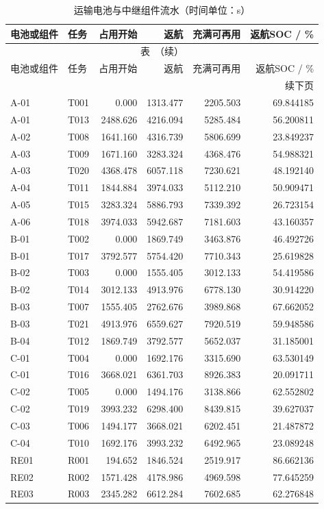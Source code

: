 \begingroup
\small
\setlength{\tabcolsep}{3pt}
\renewcommand{\arraystretch}{1.10}
\begin{longtable}{@{}llrrrr@{}}
\caption{运输电池与中继组件流水（时间单位：s）}\label{tab:q3-batteries}\\
\toprule
电池或组件 & 任务 & 占用开始 & 返航 & 充满可再用 & 返航SOC / \% \\
\midrule
\endfirsthead
\multicolumn{6}{c}{\small 表~\thetable{}（续）}\\
\toprule
电池或组件 & 任务 & 占用开始 & 返航 & 充满可再用 & 返航SOC / \% \\
\midrule
\endhead
\midrule
\multicolumn{6}{r}{\small 续下页}\\
\endfoot
\bottomrule
\endlastfoot
A-01 & T001 & 0.000 & 1313.477 & 2205.503 & 69.844185 \\
A-01 & T013 & 2488.626 & 4216.094 & 5285.484 & 56.200811 \\
A-02 & T008 & 1641.160 & 4316.739 & 5806.699 & 23.849237 \\
A-03 & T009 & 1671.160 & 3283.324 & 4368.476 & 54.988321 \\
A-03 & T020 & 4368.478 & 6057.118 & 7230.621 & 48.192140 \\
A-04 & T011 & 1844.884 & 3974.033 & 5112.210 & 50.909471 \\
A-05 & T015 & 3283.324 & 5886.793 & 7339.392 & 26.723154 \\
A-06 & T018 & 3974.033 & 5942.687 & 7181.603 & 43.160357 \\
B-01 & T002 & 0.000 & 1869.749 & 3463.876 & 46.492726 \\
B-01 & T017 & 3792.577 & 5754.420 & 7710.343 & 25.619828 \\
B-02 & T003 & 0.000 & 1555.405 & 3012.133 & 54.419586 \\
B-02 & T014 & 3012.133 & 4913.976 & 6778.130 & 30.914220 \\
B-03 & T007 & 1555.405 & 2762.676 & 3989.868 & 67.662052 \\
B-03 & T021 & 4913.976 & 6559.627 & 7920.519 & 59.948586 \\
B-04 & T012 & 1869.749 & 3792.577 & 5652.037 & 31.185001 \\
C-01 & T004 & 0.000 & 1692.176 & 3315.690 & 63.530149 \\
C-01 & T016 & 3668.021 & 6361.703 & 8926.383 & 20.091711 \\
C-02 & T005 & 0.000 & 1494.176 & 3138.866 & 62.552802 \\
C-02 & T019 & 3993.232 & 6298.400 & 8439.815 & 39.627037 \\
C-03 & T006 & 1494.177 & 3668.021 & 6202.451 & 21.487872 \\
C-04 & T010 & 1692.176 & 3993.232 & 6492.965 & 23.089248 \\
RE01 & R001 & 194.652 & 1846.524 & 2519.917 & 86.662136 \\
RE02 & R002 & 1571.428 & 4178.986 & 4969.598 & 77.645259 \\
RE03 & R003 & 2345.282 & 6612.284 & 7602.685 & 62.276848 \\
\end{longtable}
\endgroup
